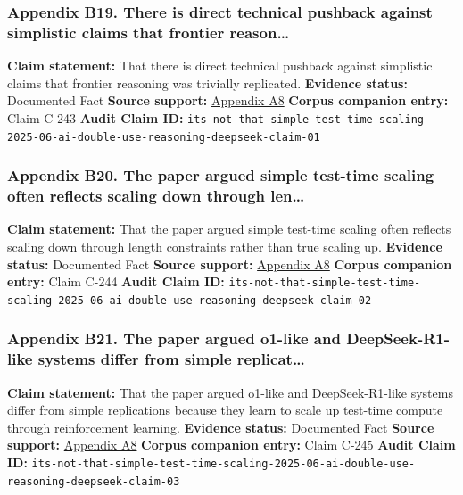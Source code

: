 \documentclass[
  american,
  11pt,
  letterpaper,
]{article}
\begin{document}
\subsubsection{Appendix B19. There is direct technical pushback against
simplistic claims that frontier
reason\ldots{}}\label{ch-06-appendix-b19-there-is-direct-technical-pushback-against-simplistic-claims-that-frontier-reason}

\textbf{Claim statement:} That there is direct technical pushback
against simplistic claims that frontier reasoning was trivially
replicated. \textbf{Evidence status:} Documented Fact \textbf{Source
support:}
\hyperref[ch-06-appendix-a8-it-s-not-that-simple-an-analysis-of-simple-test-time-scaling]{Appendix
A8} \textbf{Corpus companion entry:} Claim C-243 \textbf{Audit Claim
ID:}
\texttt{its-not-that-simple-test-time-scaling-2025-06-ai-double-use-reasoning-deepseek-claim-01}

\subsubsection{Appendix B20. The paper argued simple test-time scaling
often reflects scaling down through
len\ldots{}}\label{ch-06-appendix-b20-the-paper-argued-simple-test-time-scaling-often-reflects-scaling-down-through-len}

\textbf{Claim statement:} That the paper argued simple test-time scaling
often reflects scaling down through length constraints rather than true
scaling up. \textbf{Evidence status:} Documented Fact \textbf{Source
support:}
\hyperref[ch-06-appendix-a8-it-s-not-that-simple-an-analysis-of-simple-test-time-scaling]{Appendix
A8} \textbf{Corpus companion entry:} Claim C-244 \textbf{Audit Claim
ID:}
\texttt{its-not-that-simple-test-time-scaling-2025-06-ai-double-use-reasoning-deepseek-claim-02}

\subsubsection{Appendix B21. The paper argued o1-like and
DeepSeek-R1-like systems differ from simple
replicat\ldots{}}\label{ch-06-appendix-b21-the-paper-argued-o1-like-and-deepseek-r1-like-systems-differ-from-simple-replicat}

\textbf{Claim statement:} That the paper argued o1-like and
DeepSeek-R1-like systems differ from simple replications because they
learn to scale up test-time compute through reinforcement learning.
\textbf{Evidence status:} Documented Fact \textbf{Source support:}
\hyperref[ch-06-appendix-a8-it-s-not-that-simple-an-analysis-of-simple-test-time-scaling]{Appendix
A8} \textbf{Corpus companion entry:} Claim C-245 \textbf{Audit Claim
ID:}
\texttt{its-not-that-simple-test-time-scaling-2025-06-ai-double-use-reasoning-deepseek-claim-03}
\end{document}
